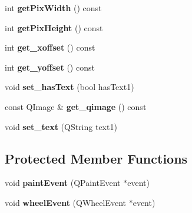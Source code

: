\begin{DoxyCompactItemize}
\item 
\hypertarget{classofeli_1_1_pixmap_widget_aaa829326021c312a97374c1362f8d298}{int {\bfseries get\-Pix\-Width} () const }\label{classofeli_1_1_pixmap_widget_aaa829326021c312a97374c1362f8d298}

\item 
\hypertarget{classofeli_1_1_pixmap_widget_a978fbda49d780bb1444bd049aaf6e3fb}{int {\bfseries get\-Pix\-Height} () const }\label{classofeli_1_1_pixmap_widget_a978fbda49d780bb1444bd049aaf6e3fb}

\item 
\hypertarget{classofeli_1_1_pixmap_widget_a7e09147dfb98b3fb96e98d284b33fd71}{int {\bfseries get\-\_\-xoffset} () const }\label{classofeli_1_1_pixmap_widget_a7e09147dfb98b3fb96e98d284b33fd71}

\item 
\hypertarget{classofeli_1_1_pixmap_widget_a65b752a51f28973ef731cfd96ef1b726}{int {\bfseries get\-\_\-yoffset} () const }\label{classofeli_1_1_pixmap_widget_a65b752a51f28973ef731cfd96ef1b726}

\item 
\hypertarget{classofeli_1_1_pixmap_widget_a104e3d8592d5c6ed4bd06576e434d31b}{void {\bfseries set\-\_\-has\-Text} (bool has\-Text1)}\label{classofeli_1_1_pixmap_widget_a104e3d8592d5c6ed4bd06576e434d31b}

\item 
\hypertarget{classofeli_1_1_pixmap_widget_ab68827bf2b993a222b16e35a886f5b32}{const Q\-Image \& {\bfseries get\-\_\-qimage} () const }\label{classofeli_1_1_pixmap_widget_ab68827bf2b993a222b16e35a886f5b32}

\item 
\hypertarget{classofeli_1_1_pixmap_widget_ab98a6363c2b5bf9653fff1fa64e593d6}{void {\bfseries set\-\_\-text} (Q\-String text1)}\label{classofeli_1_1_pixmap_widget_ab98a6363c2b5bf9653fff1fa64e593d6}

\end{DoxyCompactItemize}
\subsection*{Protected Member Functions}
\begin{DoxyCompactItemize}
\item 
\hypertarget{classofeli_1_1_pixmap_widget_abd9c20f706e6d1ff8147ddb3a911e8f5}{void {\bfseries paint\-Event} (Q\-Paint\-Event $\ast$event)}\label{classofeli_1_1_pixmap_widget_abd9c20f706e6d1ff8147ddb3a911e8f5}

\item 
\hypertarget{classofeli_1_1_pixmap_widget_af12f9ad6114acba9f3907fe20577a2a9}{void {\bfseries wheel\-Event} (Q\-Wheel\-Event $\ast$event)}\label{classofeli_1_1_pixmap_widget_af12f9ad6114acba9f3907fe20577a2a9}

\end{DoxyCompactItemize}
